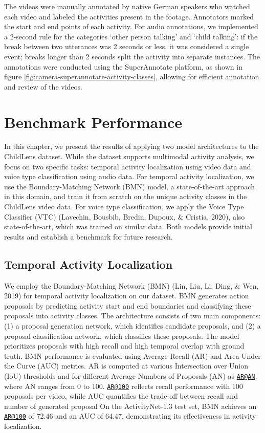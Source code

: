 \documentclass[
  man,floatsintext]{apa6}
\begin{document}
The videos were manually annotated by native German speakers who watched each video and labeled the activities present in the footage. Annotators marked the start and end points of each activity. For audio annotations, we implemented a 2-second rule for the categories `other person talking' and `child talking': if the break between two utterances was 2 seconds or less, it was considered a single event; breaks longer than 2 seconds split the activity into separate instances. The annotations were conducted using the SuperAnnotate platform, as shown in figure \ref{fig:camera-superannotate-activity-classes}, allowing for efficient annotation and review of the videos.

\section{Benchmark Performance}\label{benchmark-performance}

In this chapter, we present the results of applying two model architectures to the ChildLens dataset. While the dataset supports multimodal activity analysis, we focus on two specific tasks: temporal activity localization using video data and voice type classification using audio data. For temporal activity localization, we use the Boundary-Matching Network (BMN) model, a state-of-the-art approach in this domain, and train it from scratch on the unique activity classes in the ChildLens video data. For voice type classification, we apply the Voice Type Classifier (VTC) (Lavechin, Bousbib, Bredin, Dupoux, \& Cristia, 2020), also state-of-the-art, which was trained on similar data. Both models provide initial results and establish a benchmark for future research.

\subsection{Temporal Activity Localization}\label{temporal-activity-localization}

We employ the Boundary-Matching Network (BMN) (Lin, Liu, Li, Ding, \& Wen, 2019) for temporal activity localization on our dataset. BMN generates action proposals by predicting activity start and end boundaries and classifying these proposals into activity classes. The architecture consists of two main components: (1) a proposal generation network, which identifies candidate proposals, and (2) a proposal classification network, which classifies these proposals. The model prioritizes proposals with high recall and high temporal overlap with ground truth.
BMN performance is evaluated using Average Recall (AR) and Area Under the Curve (AUC) metrics. AR is computed at various Intersection over Union (IoU) thresholds and for different Average Numbers of Proposals (AN) as \href{mailto:AR@AN}{\nolinkurl{AR@AN}}, where AN ranges from 0 to 100. \href{mailto:AR@100}{\nolinkurl{AR@100}} reflects recall performance with 100 proposals per video, while AUC quantifies the trade-off between recall and number of generated proposal On the ActivityNet-1.3 test set, BMN achieves an \href{mailto:AR@100}{\nolinkurl{AR@100}} of 72.46 and an AUC of 64.47, demonstrating its effectiveness in activity localization.
\end{document}
